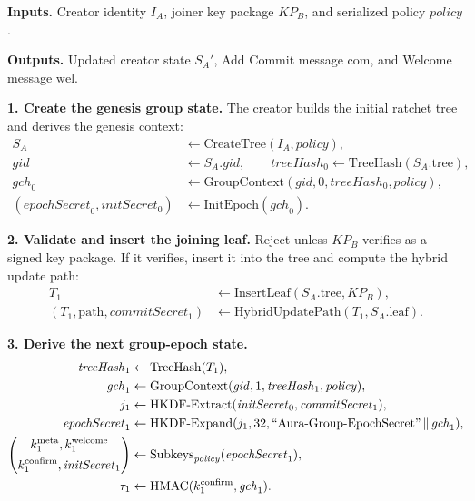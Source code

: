 \documentclass[preprint,12pt]{elsarticle}
\theoremstyle{definition}
\newcommand{\tech}[1]{\textnormal{#1}}
\newcommand{\domain}[1]{\textnormal{``#1''}}
\renewcommand{\mathsf}[1]{\mathrm{#1}}
\newcommand{\HKDF}{\tech{HKDF}}
\newcommand{\HMAC}{\tech{HMAC}}
\newcommand{\concat}{\,\|\,}
\newcommand{\gid}{\mathit{gid}}
\newcommand{\gch}{\mathit{gch}}
\newcommand{\initsec}{\mathit{initSecret}}
\newcommand{\commitsec}{\mathit{commitSecret}}
\newcommand{\epochsec}{\mathit{epochSecret}}
\newcommand{\policy}{\mathit{policy}}
\newcommand{\treehash}{\mathit{treeHash}}
\begin{document}
\begingroup
\LinesNotNumbered
\SetAlgoNoLine
\begin{algorithm}[H]
\caption{Create a policy-bound group and add one member.}\label{alg:create-add}
\footnotesize
\textbf{Inputs.}
Creator identity $I_A$, joiner key package $KP_B$, and serialized policy $\policy$.

\textbf{Outputs.}
Updated creator state $S_A'$, Add Commit message $\mathsf{com}$, and Welcome message $\mathsf{wel}$.
\vspace{0.25\baselineskip}

\textbf{1. Create the genesis group state.}
The creator builds the initial ratchet tree and derives the genesis context:
\[
\begin{aligned}
S_A &\gets \mathrm{CreateTree}(I_A,\policy),\\
\gid &\gets S_A.\gid,\qquad
\treehash_0\gets \mathsf{TreeHash}(S_A.\mathrm{tree}),\\
\gch_0 &\gets \mathsf{GroupContext}(\gid,0,\treehash_0,\policy),\\
(\epochsec_0,\initsec_0)&\gets \mathrm{InitEpoch}(\gch_0).
\end{aligned}
\]

\textbf{2. Validate and insert the joining leaf.}
Reject unless $KP_B$ verifies as a signed key package. If it verifies, insert it
into the tree and compute the hybrid update path:
\[
\begin{aligned}
T_1 &\gets \mathrm{InsertLeaf}(S_A.\mathrm{tree},KP_B),\\
(T_1,\mathsf{path},\commitsec_1)&\gets
  \mathrm{HybridUpdatePath}(T_1,S_A.\mathrm{leaf}).
\end{aligned}
\]

\textbf{3. Derive the next group-epoch state.}
\[
\begin{aligned}
\treehash_1&\gets \mathsf{TreeHash}(T_1),\\
\gch_1&\gets \mathsf{GroupContext}(\gid,1,\treehash_1,\policy),\\
j_1&\gets
  \HKDF\text{-}\mathrm{Extract}(\initsec_0,\commitsec_1),\\
\epochsec_1&\gets
  \HKDF\text{-}\mathrm{Expand}(j_1,32,
  \domain{Aura-Group-EpochSecret}\concat\gch_1),\\
\left(\begin{gathered}
  k^{\mathsf{meta}}_1,k^{\mathsf{welcome}}_1\\
  k^{\mathsf{confirm}}_1,\initsec_1
\end{gathered}\right)
  &\gets \mathrm{Subkeys}_{\policy}(\epochsec_1),\\
\tau_1&\gets \HMAC(k^{\mathsf{confirm}}_1,\gch_1).
\end{aligned}
\]


\end{algorithm}
\end{document}
